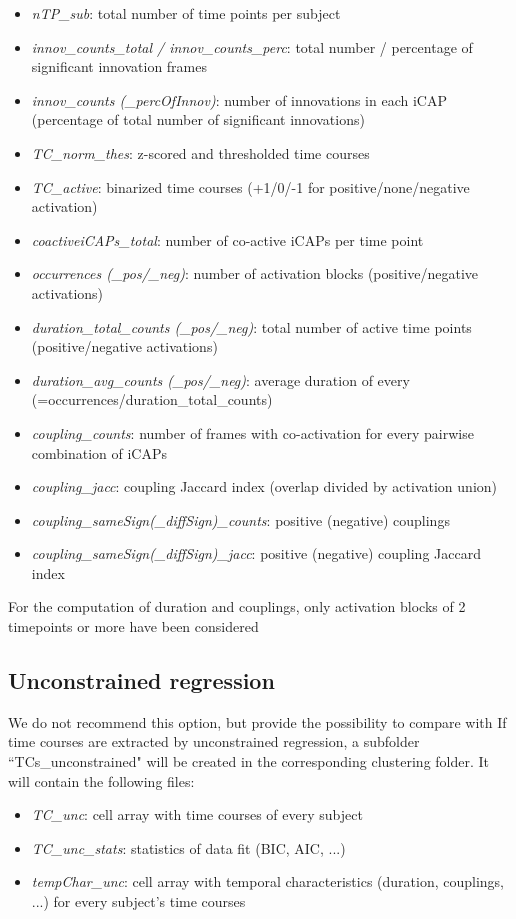 \documentclass{article}
\begin{document}
\begin{itemize}
	\item \textit{nTP\_sub}: total number of time points per subject
	\item \textit{innov\_counts\_total / innov\_counts\_perc}: total number / percentage of significant innovation frames
	\item \textit{innov\_counts (\_percOfInnov)}: number of innovations in each iCAP (percentage of total number of significant innovations)
	\item \textit{TC\_norm\_thes}: z-scored and thresholded time courses
	\item \textit{TC\_active}: binarized time courses (+1/0/-1 for positive/none/negative activation)
	\item \textit{coactiveiCAPs\_total}: number of co-active iCAPs per time point
	\item \textit{occurrences (\_pos/\_neg)}: number of activation blocks (positive/negative activations)
	\item \textit{duration\_total\_counts (\_pos/\_neg)}: total number of active time points (positive/negative activations)
	\item \textit{duration\_avg\_counts (\_pos/\_neg)}: average duration of every  (=occurrences/duration\_total\_counts)
	\item \textit{coupling\_counts}: number of frames with co-activation for every pairwise combination of iCAPs
	\item \textit{coupling\_jacc}: coupling Jaccard index (overlap divided by activation union)
	\item \textit{coupling\_sameSign(\_diffSign)\_counts}: positive (negative) couplings
	\item \textit{coupling\_sameSign(\_diffSign)\_jacc}: positive (negative) coupling Jaccard index
\end{itemize}
For the computation of duration and couplings, only activation blocks of 2 timepoints or more have been considered


\subsection{Unconstrained regression}
We do not recommend this option, but provide the possibility to compare with \cite{Karahanoglu2015,Bolton2018}
If time courses are extracted by unconstrained regression, a subfolder ``TCs\_unconstrained" will be created in the corresponding clustering folder. It will contain the following files:
\begin{itemize}
	\item \textit{TC\_unc}: cell array with time courses of every subject
	\item \textit{TC\_unc\_stats}: statistics of data fit (BIC, AIC, ...)
	\item \textit{tempChar\_unc}: cell array with temporal characteristics (duration, couplings, ...) for every subject's time courses
\end{itemize}
\end{document}
